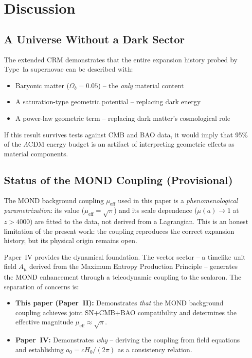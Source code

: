 \documentclass[aps,prd,twocolumn,superscriptaddress,nofootinbib]{revtex4-2}
\begin{document}
\section{Discussion}
\label{sec:discussion}

\subsection{A Universe Without a Dark Sector}

The extended CRM demonstrates that the entire expansion history probed by Type~Ia supernovae can be described with:
\begin{itemize}
\item Baryonic matter ($\Omega_b = 0.05$) -- the \textit{only} material content
\item A saturation-type geometric potential -- replacing dark energy
\item A power-law geometric term -- replacing dark matter's cosmological role
\end{itemize}

If this result survives tests against CMB and BAO data, it would imply that 95\% of the $\Lambda$CDM energy budget is an artifact of interpreting geometric effects as material components.

\subsection{Status of the MOND Coupling (Provisional)}
\label{subsec:mond_status}

The MOND background coupling $\mu_{\mathrm{eff}}$ used in this paper is a \emph{phenomenological parametrization}: its value ($\mu_{\mathrm{eff}} = \sqrt{\pi}$) and its scale dependence ($\mu(a) \to 1$ at $z > 4000$) are fitted to the data, not derived from a Lagrangian. This is an honest limitation of the present work: the coupling reproduces the correct expansion history, but its physical origin remains open.

Paper~IV \cite{Geiger2026d} provides the dynamical foundation. The vector sector -- a timelike unit field $A_\mu$ derived from the Maximum Entropy Production Principle -- generates the MOND enhancement through a teleodynamic coupling to the scalaron. The separation of concerns is:
\begin{itemize}
\item \textbf{This paper (Paper~II):} Demonstrates \emph{that} the MOND background coupling achieves joint SN+CMB+BAO compatibility and determines the effective magnitude $\mu_{\mathrm{eff}} \approx \sqrt{\pi}$.
\item \textbf{Paper~IV:} Demonstrates \emph{why} -- deriving the coupling from field equations and establishing $a_0 = cH_0/(2\pi)$ as a consistency relation.
\end{itemize}
\end{document}
